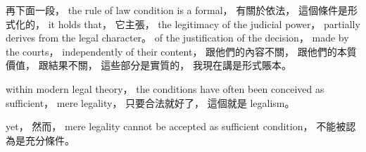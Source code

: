 \hypertarget{w02:cue:1454}{}再下面一段，
\hypertarget{w02:cue:1455}{}the rule of law condition is a formal，
\hypertarget{w02:cue:1456}{}有關於依法，
\hypertarget{w02:cue:1457}{}這個條件是形式化的，
\hypertarget{w02:cue:1458}{}it holds that，
\hypertarget{w02:cue:1459}{}它主張，
\hypertarget{w02:cue:1460}{}the legitimacy of the judicial power，
\hypertarget{w02:cue:1461}{}partially derives from the legal character。
\hypertarget{w02:cue:1462}{}of the justification of the decision，
\hypertarget{w02:cue:1463}{}made by the courts，
\hypertarget{w02:cue:1464}{}independently of their content，
\hypertarget{w02:cue:1465}{}跟他們的內容不關，
\hypertarget{w02:cue:1466}{}跟他們的本質價值，
\hypertarget{w02:cue:1467}{}跟結果不關，
\hypertarget{w02:cue:1468}{}這些部分是實質的，
\hypertarget{w02:cue:1469}{}我現在講是形式賬本。

\hypertarget{w02:cue:1470}{}within modern legal theory，
\hypertarget{w02:cue:1471}{}the conditions have often been conceived as sufficient，
\hypertarget{w02:cue:1472}{}mere legality，
\hypertarget{w02:cue:1473}{}只要合法就好了，
\hypertarget{w02:cue:1474}{}這個就是 legalism。

\hypertarget{w02:cue:1475}{}yet，
\hypertarget{w02:cue:1476}{}然而，
\hypertarget{w02:cue:1477}{}mere legality cannot be accepted as sufficient condition，
\hypertarget{w02:cue:1478}{}不能被認為是充分條件。

